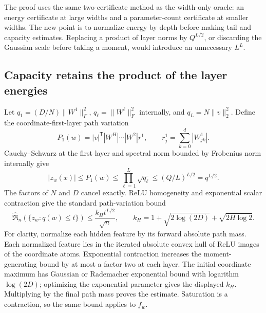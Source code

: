 The proof uses the same two-certificate method as the width-only oracle: an energy certificate at large widths and a parameter-count certificate at smaller widths. The new point is to normalize energy by depth before making tail and capacity estimates. Replacing a product of layer norms by $Q^{L/2}$, or discarding the Gaussian scale before taking a moment, would introduce an unnecessary $L^L$.

\subsection{Capacity retains the product of the layer energies}
Let $q_1=(D/N)\|W^1\|_F^2$, $q_\ell=\|W^\ell\|_F^2$ internally, and $q_L=N\|v\|_2^2$. Define the coordinate-first-layer path variation
\[
 P_1(w)=|v|^{\mathsf T}|W^H|\cdots|W^2|r^1,
 \qquad r^1_j=\sum_{k=0}^d|W^1_{jk}|.
\]
Cauchy--Schwarz at the first layer and spectral norm bounded by Frobenius norm internally give
\[
 |z_w(x)|\le P_1(w)\le\prod_{\ell=1}^L\sqrt{q_\ell}
             \le(Q/L)^{L/2}=q^{L/2}.
\]
The factors of $N$ and $D$ cancel exactly. ReLU homogeneity and exponential scalar contraction give the standard path-variation bound
\begin{equation}
 \widehat{\mathfrak R}_n(\{z_w:q(w)\le t\})
 \le\frac{k_H t^{L/2}}{\sqrt n},\qquad
 k_H=1+\sqrt{2\log(2D)}+\sqrt{2H\log2}.
 \label{eq:depth-capacity}
\end{equation}
For clarity, normalize each hidden feature by its forward absolute path mass. Each normalized feature lies in the iterated absolute convex hull of ReLU images of the coordinate atoms. Exponential contraction increases the moment-generating bound by at most a factor two at each layer. The initial coordinate maximum has Gaussian or Rademacher exponential bound with logarithm $\log(2D)$; optimizing the exponential parameter gives the displayed $k_H$. Multiplying by the final path mass proves the estimate. Saturation is a contraction, so the same bound applies to $f_w$.

